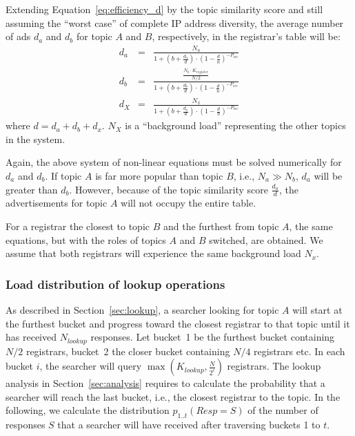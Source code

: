 Extending Equation~\ref{eq:efficiency_d} by the topic similarity score and still assuming the ``worst case'' of complete IP address diversity, the average number of ads $d_a$ and $d_b$ for topic $A$ and $B$, respectively, in the registrar's table will be:
\begin{eqnarray}
d_a & = & \frac{N_a}{1 + (b + \frac{d_a}{d}) \cdot (1 - \frac{d}{n})^{-P_\textit{occ}}}\label{eq:da_fair}\\
d_b & = & \frac{\frac{N_b\cdot K_\textit{register}}{N/2}}{1 + (b + \frac{d_b}{d}) \cdot (1 - \frac{d}{n})^{-P_\textit{occ}}}\\
\label{eq:da_fair2}
d_X & = & \frac{N_x}{1 + (b + \frac{d_x}{d}) \cdot (1 - \frac{d}{n})^{-P_\textit{occ}}}
\end{eqnarray}
where $d = d_a + d_b + d_x$. $N_X$ is a ``background load'' representing the other topics in the system.

Again, the above system of non-linear equations must be solved numerically for $d_a$ and $d_b$.
If topic $A$ is far more popular than topic $B$, i.e., $N_a \gg N_b$, $d_a$ will be greater than $d_b$. However, because of the topic similarity score $\frac{d_a}{d}$, the advertisements for topic $A$ will not occupy the entire table.

For a registrar the closest to topic $B$ and the furthest from topic $A$, the same equations, but with the roles of topics $A$ and $B$ switched, are obtained. We assume that both registrars will experience the same background load $N_x$.

\subsubsection{Load distribution of lookup operations}

As described in Section~\ref{sec:lookup}, a searcher looking for topic $A$ will start at the furthest bucket and progress toward the closest registrar to that topic until it has received $N_\textit{lookup}$ responses.
Let bucket~1 be the furthest bucket containing $N/2$ registrars, bucket~2 the closer bucket containing $N/4$ registrars etc. In each bucket $i$, the searcher will query $\max(K_\textit{lookup}, \frac{N}{2^i})$ registrars.
The lookup analysis in Section~\ref{sec:analysis} requires to calculate the probability that a searcher will reach the last bucket, i.e., the closest registrar to the topic. In the following, we calculate the distribution $p_{1..t}(Resp=S)$ of the number of responses $S$ that a searcher will have received after traversing buckets 1 to $t$.

